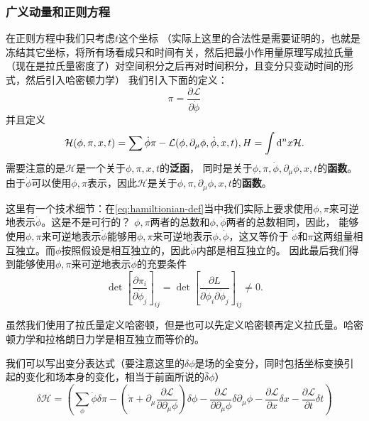 \documentclass[UTF8, a4paper]{ctexart}
\begin{document}
\subsubsection{广义动量和正则方程}
在正则方程中我们只考虑$t$这个坐标
（实际上这里的合法性是需要证明的，也就是冻结其它坐标，将所有场看成只和时间有关，然后把最小作用量原理写成拉氏量（现在是拉氏量密度了）对空间积分之后再对时间积分，且变分只变动时间的形式，然后引入哈密顿力学）
我们引入下面的定义：
\begin{equation}
    \pi = \frac{\partial \mathcal{L}}{\partial \dot{\phi}}
    \label{eq:generalized-momentum-def}
\end{equation}
并且定义
\begin{equation}
    \mathcal{H}(\phi, \pi, x, t) = \sum \dot{\phi} \pi - \mathcal{L}(\phi, \partial_\mu \phi, \dot{\phi}, x, t), \\
    H = \int \mathrm{d}^n x \mathcal{H}.
    \label{eq:hamiltionian-def}
\end{equation}
需要注意的是$\mathcal{H}$是一个关于$\phi, \pi, x, t$的\textbf{泛函}，
同时是关于$\phi, \pi, \dot{\phi}, \partial_\mu \phi, x, t$的\textbf{函数}。
由于$\dot{\phi}$可以使用$\phi, \pi$表示，因此$\mathcal{H}$是关于$\phi, \pi,  \partial_\mu \phi, x, t$的\textbf{函数}。

这里有一个技术细节：在\eqref{eq:hamiltionian-def}当中我们实际上要求使用$\phi, \pi$来可逆地表示$\dot{\phi}$。这是不是可行的？
$\phi, \pi$两者的总数和$\phi, \dot{\phi}$两者的总数相同，因此，
能够使用$\phi, \pi$来可逆地表示$\dot{\phi}$能够用$\phi, \pi$来可逆地表示$\phi, \dot{\phi}$，这又等价于
$\dot{\phi}$和$\pi$这两组量相互独立。而$\phi$按照假设是相互独立的，因此$\dot{\phi}$内部是相互独立的。
因此最后我们得到能够使用$\phi, \pi$来可逆地表示$\dot{\phi}$的充要条件
\begin{equation}
    \det \left[ \frac{\partial \pi_i}{\partial \dot{\phi}_j} \right]_{ij}
    = \det \left[ \frac{\partial L}{\partial \dot{\phi}_i \partial \dot{\phi}_j} \right]_{ij} \neq 0.
\end{equation}

虽然我们使用了拉氏量定义哈密顿，但是也可以先定义哈密顿再定义拉氏量。哈密顿力学和拉格朗日力学是相互独立而等价的。

我们可以写出变分表达式（要注意这里的$\delta \phi$是场的全变分，同时包括坐标变换引起的变化和场本身的变化，相当于前面所说的$\bar{\delta} \phi$）
\[
    \delta \mathcal{H} = \left(\sum_\phi \dot{\phi} \delta \pi  - (\dot{\pi} + \partial_\mu \frac{\partial \mathcal{L}}{\partial \partial_\mu \phi}) \delta \phi - \frac{\partial \mathcal{L}}{\partial \partial_\mu \phi} \delta \partial_\mu \phi - \frac{\partial \mathcal{L}}{\partial x} \delta x - \frac{\partial \mathcal{L}}{\partial t} \delta t \right)
\]
\end{document}
